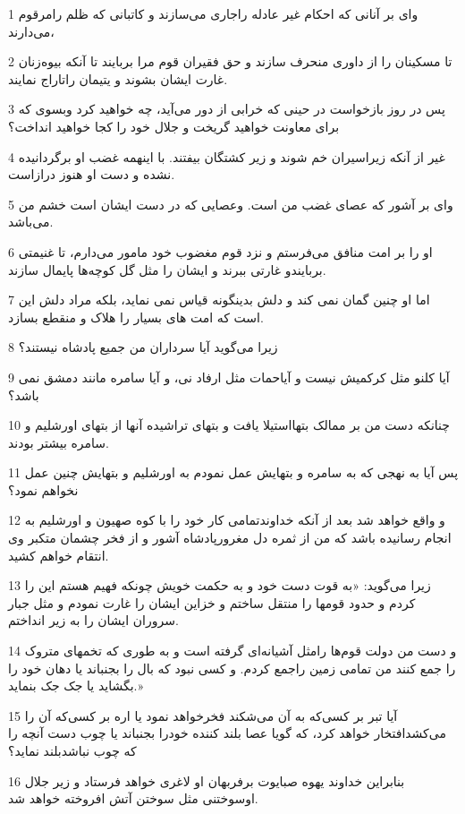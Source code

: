 \par 1 وای بر آنانی که احکام غیر عادله راجاری می‌سازند و کاتبانی که ظلم رامرقوم می‌دارند،
\par 2 تا مسکینان را از داوری منحرف سازند و حق فقیران قوم مرا بربایند تا آنکه بیوه‌زنان غارت ایشان بشوند و یتیمان راتاراج نمایند.
\par 3 پس در روز بازخواست در حینی که خرابی از دور می‌آید، چه خواهید کرد وبسوی که برای معاونت خواهید گریخت و جلال خود را کجا خواهید انداخت؟
\par 4 غیر از آنکه زیراسیران خم شوند و زیر کشتگان بیفتند. با اینهمه غضب او برگردانیده نشده و دست او هنوز درازاست.
\par 5 وای بر آشور که عصای غضب من است. وعصایی که در دست ایشان است خشم من می‌باشد.
\par 6 او را بر امت منافق می‌فرستم و نزد قوم مغضوب خود مامور می‌دارم، تا غنیمتی بربایندو غارتی ببرند و ایشان را مثل گل کوچه‌ها پایمال سازند.
\par 7 اما او چنین گمان نمی کند و دلش بدینگونه قیاس نمی نماید، بلکه مراد دلش این است که امت های بسیار را هلاک و منقطع بسازد.
\par 8 زیرا می‌گوید آیا سرداران من جمیع پادشاه نیستند؟
\par 9 آیا کلنو مثل کرکمیش نیست و آیاحمات مثل ارفاد نی، و آیا سامره مانند دمشق نمی باشد؟
\par 10 چنانکه دست من بر ممالک بتهااستیلا یافت و بتهای تراشیده آنها از بتهای اورشلیم و سامره بیشتر بودند.
\par 11 پس آیا به نهجی که به سامره و بتهایش عمل نمودم به اورشلیم و بتهایش چنین عمل نخواهم نمود؟
\par 12 و واقع خواهد شد بعد از آنکه خداوندتمامی کار خود را با کوه صهیون و اورشلیم به انجام رسانیده باشد که من از ثمره دل مغرورپادشاه آشور و از فخر چشمان متکبر وی انتقام خواهم کشید.
\par 13 زیرا می‌گوید: «به قوت دست خود و به حکمت خویش چونکه فهیم هستم این را کردم و حدود قومها را منتقل ساختم و خزاین ایشان را غارت نمودم و مثل جبار سروران ایشان را به زیر انداختم.
\par 14 و دست من دولت قوم‌ها رامثل آشیانه‌ای گرفته است و به طوری که تخمهای متروک را جمع کنند من تمامی زمین راجمع کردم. و کسی نبود که بال را بجنباند یا دهان خود را بگشاید یا جک جک بنماید.»
\par 15 آیا تبر بر کسی‌که به آن می‌شکند فخرخواهد نمود یا اره بر کسی‌که آن را می‌کشدافتخار خواهد کرد، که گویا عصا بلند کننده خودرا بجنباند یا چوب دست آنچه را که چوب نباشدبلند نماید؟
\par 16 بنابراین خداوند یهوه صبایوت برفربهان او لاغری خواهد فرستاد و زیر جلال اوسوختنی مثل سوختن آتش افروخته خواهد شد.
